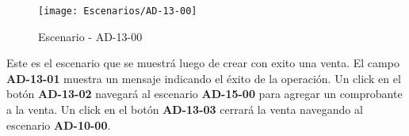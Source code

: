 \begin{figure}[H]
\centering
\texttt{[image: Escenarios/AD-13-00]}
\caption{Escenario - AD-13-00}
\label{fig:AD-13-00}
\end{figure}
Este es el escenario que se muestrá luego de crear con exito una venta. El campo \textbf{AD-13-01} muestra un mensaje indicando el éxito de la operación. Un click en el botón \textbf{AD-13-02} navegará al escenario \textbf{AD-15-00} para agregar un comprobante a la venta. Un click en el botón \textbf{AD-13-03} cerrará la venta navegando al escenario \textbf{AD-10-00}.
\\